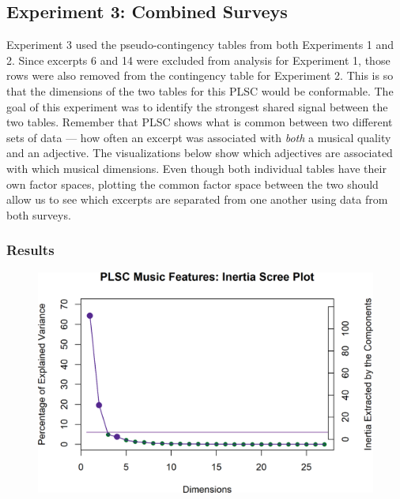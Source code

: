 \documentclass[
  english,
  man,floatsintext]{apa6}
\begin{document}
\hypertarget{experiment-3-combined-surveys}{%
\subsection{Experiment 3: Combined Surveys}\label{experiment-3-combined-surveys}}

Experiment 3 used the pseudo-contingency tables from both Experiments 1 and 2. Since excerpts 6 and 14 were excluded from analysis for Experiment 1, those rows were also removed from the contingency table for Experiment 2. This is so that the dimensions of the two tables for this PLSC would be conformable. The goal of this experiment was to identify the strongest shared signal between the two tables. Remember that PLSC shows what is common between two different sets of data --- how often an excerpt was associated with \emph{both} a musical quality and an adjective. The visualizations below show which adjectives are associated with which musical dimensions. Even though both individual tables have their own factor spaces, plotting the common factor space between the two should allow us to see which excerpts are separated from one another using data from both surveys.

\hypertarget{results-2}{%
\subsubsection{Results}\label{results-2}}

\begin{figure}  
  \begin{center}
    \includegraphics{./Music-Descriptor-Space_files/figure-latex/screePLSC-1.png}
  \caption{ }\label{fig:screePLSC}  
 \end{center}
\end{figure}
\end{document}
